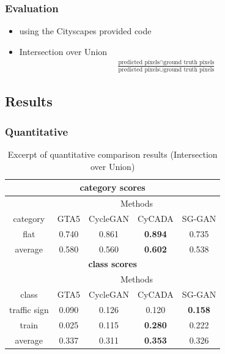 \documentclass{beamer}
\begin{document}
\begin{frame}
\frametitle{Evaluation}
\begin{itemize}
	\item using the Cityscapes provided code
	\item Intersection over Union
	\begin{align*}
		\frac{\text{predicted pixels} \cap \text{ground truth pixels}}{\text{predicted pixels} \cup \text{ground truth pixels}}
	\end{align*}
\end{itemize}
\end{frame}

\subsection{Results}

\begin{frame}
\frametitle{Quantitative}
\begin{table}
	\centering
	\begin{tabular}{|c|c|c|c|c|}
	\multicolumn{5}{c}{\textbf{category scores}}\\
	\hline
	\multicolumn{1}{c}{} & \multicolumn{4}{c}{Methods}\\
	\cline{2-5}
	\multicolumn{1}{c|}{category} & GTA5 & CycleGAN & CyCADA & SG-GAN\\ 
	\hline
	flat & 0.740 & 0.861 & \textbf{0.894} & 0.735\\ 
	average & 0.580 & 0.560 & \textbf{0.602} & 0.538\\
	\hline
	\multicolumn{5}{c}{\textbf{class scores}}\\
	\hline
	\multicolumn{1}{c}{} & \multicolumn{4}{c}{Methods}\\
	\cline{2-5}
	\multicolumn{1}{c|}{class} & GTA5 & CycleGAN & CyCADA & SG-GAN\\ 
	\hline
	traffic sign & 0.090 & 0.126 & 0.120 & \textbf{0.158}\\ 
	\hline 
	train & 0.025 & 0.115 & \textbf{0.280} & 0.222\\ 
	\hline 
	average & 0.337 & 0.311 & \textbf{0.353} & 0.326\\
	\hline
\end{tabular} 
	\caption{Excerpt of quantitative comparison results (Intersection over Union)}
\end{table}
\end{frame}
\end{document}
